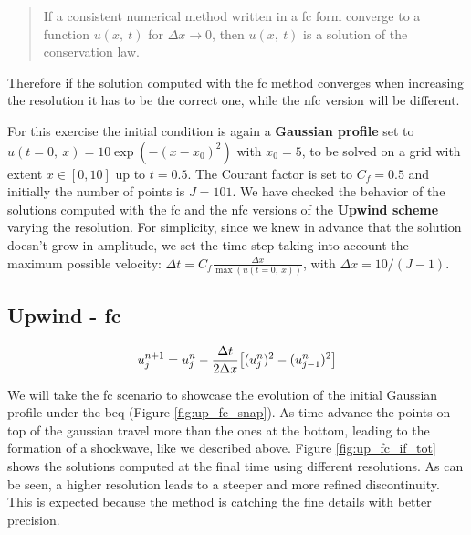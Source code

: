 \documentclass[11pt, a4paper]{article}
\begin{document}
\begin{quote}
    If a consistent numerical method written in a \acrshort{fc} form converge to a function \(u(x,\ t)\) for \(\Delta x \to 0\), then \(u(x,\ t)\) is a solution of the conservation law.
\end{quote}

\noindent
Therefore if the solution computed with the \acrshort{fc} method converges when increasing the resolution it has to be the correct one, while the \acrshort{nfc} version will be different.

For this exercise the initial condition is again a \textbf{Gaussian profile} set to \(u(t = 0,\ x) = 10 \exp(-(x - x_0)^2)\) with \(x_0 = 5\), to be solved on a grid with extent \(x \in [0, 10]\) up to \(t = 0.5\). The Courant factor is set to \(C_f = 0.5\) and initially the number of points is \(J = 101\). We have checked the behavior of the solutions computed with the \acrshort{fc} and the \acrshort{nfc} versions of the \textbf{Upwind scheme} varying the resolution. For simplicity, since we knew in advance that the solution doesn't grow in amplitude, we set the time step taking into account the maximum possible velocity: \(\Delta t = C_f \frac{\Delta x}{\max(u(t = 0,\ x))}\), with \(\Delta x = 10 / (J - 1)\).

\subsection{Upwind - \acrlong{fc}}

\begin{equation} \label{eq:up-fc}
    u^{n+1}_j = u^n_j - \frac{\Delta t}{2 \Delta x} \qty[(u^n_j)^2 - (u^n_{j-1})^2]
\end{equation}

We will take the \acrshort{fc} scenario to showcase the evolution of the initial Gaussian profile under the \acrshort{beq} (Figure \ref{fig:up_fc_snap}). As time advance the points on top of the gaussian travel more than the ones at the bottom, leading to the formation of a shockwave, like we described above. Figure \ref{fig:up_fc_if_tot} shows the solutions computed at the final time using different resolutions. As can be seen, a higher resolution leads to a steeper and more refined discontinuity. This is expected because the method is catching the fine details with better precision.
\end{document}
